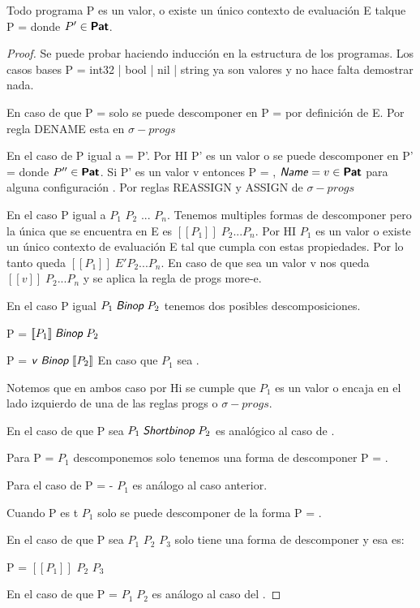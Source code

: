 \begin{lemma}
    Todo programa P es un valor, o existe un único contexto de evaluación E talque 
    P =  donde $P' \in \textsf{\textbf{Pat}}$.
\end{lemma}

\begin{proof}
Se puede probar haciendo inducción en la estructura de los programas.
Los casos bases P = int32 | bool | nil | string ya son valores y no hace falta demostrar nada.

En caso de que P =  solo se puede descomponer en P =  por definición de E. Por regla DENAME esta en $\sigma-progs$

En el caso de P igual a  = P'.
Por HI P' es un valor o se puede descomponer en P' = 
donde $P'' \in \textsf{\textbf{Pat}}$.
Si P' es un valor v entonces P = , $\textsf{\textit{Name}} = v \in \textsf{\textbf{Pat}}$ para alguna configuración .
Por reglas REASSIGN y ASSIGN de $\sigma-progs$

En el caso P igual a $P_{1}$ $P_{2}$ ... $P_{n}$. Tenemos multiples formas de descomponer pero la única que se encuentra en E es
$[\![P_{1}]\!] \; P_{2} ... P_{n}$. Por HI $P_{1}$ es un valor o existe un único contexto de evaluación E tal que cumpla con estas propiedades.
Por lo tanto queda $[\![P_{1}]\!] \; E' P_{2} ... P_{n}$. En caso de que sea un valor v nos queda $[\![v]\!] \; P_{2} ... P_{n}$ y se aplica la regla de progs more-e.

En el caso P igual $P_{1} \; \textsf{\textit{Binop}} \; P_{2}$ tenemos dos posibles descomposiciones.

P = $[\![P_{1}]\!] \; \textsf{\textit{Binop}} \; P_{2}$ 

P = $\textsf{\textit{v}} \; \textsf{\textit{Binop}} \; [\![P_{2}]\!]$ En caso que $P_{1}$ sea .

Notemos que en ambos caso por Hi se cumple que $P_{1}$ es un valor o encaja en el lado izquierdo de una de las reglas progs o $\sigma-progs$.

En el caso de que P sea $P_{1} \; \textsf{\textit{Shortbinop}} \; P_{2}$ es analógico al caso de .

Para P =  $P_{1}$ descomponemos solo tenemos una forma de descomponer P = .

Para el caso de P = - $P_{1}$ es análogo al caso anterior.

Cuando P es  t $P_{1}$ solo se puede descomponer de la forma P = .

En el caso de que P sea  $P_{1}$  $P_{2}$  $P_{3}$ solo tiene una forma de descomponer y esa es:

P =  $[\![P_{1}]\!]$  $P_{2}$  $P_{3}$

En el caso de que P =  $P_{1} \; P_{2}$ es análogo al caso del .




\end{proof}
